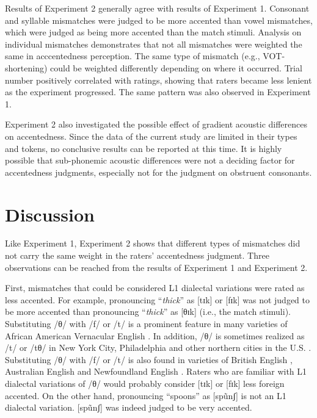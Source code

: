 Results of Experiment 2 generally agree with results of Experiment 1. Consonant and syllable mismatches were judged to be more accented than vowel mismatches, which were judged as being more accented than the match stimuli. Analysis on individual mismatches demonstrates that not all mismatches were weighted the same in acccentedness perception. The same type of mismatch (e.g., VOT-shortening) could be weighted differently depending on where it occurred. Trial number positively correlated with ratings, showing that raters became less lenient as the experiment progressed. The same pattern was also observed in Experiment 1. 

Experiment 2 also investigated the possible effect of gradient acoustic differences on accentedness. Since the data of the current study are limited in their types and tokens, no conclusive results can be reported at this time. It is highly possible that sub-phonemic acoustic differences were not a deciding factor for accentedness judgments, especially not for the judgment on obstruent consonants.

\section{Discussion}
Like Experiment 1, Experiment 2 shows that different types of mismatches did not carry the same weight in the raters’ accentedness judgment. Three observations can be reached from the results of Experiment 1 and Experiment 2.

First, mismatches that could be considered L1 dialectal variations were rated as less accented. For example, pronouncing “\textit{thick}” as [tɪk] or [fɪk] was not judged to be more accented than pronouncing “\textit{thick}” as [θɪk] (i.e., the match stimuli). Substituting /θ/ with /f/ or /t/ is a prominent feature in many varieties of African American Vernacular English \citep{Green_2002}. In addition, /θ/ is sometimes realized as /t/ or /tθ/ in New York City, Philadelphia and other northern cities in the U.S. \citep{Gordon_2008}. Substituting /θ/ with /f/ or /t/ is also found in varieties of British English \citep{Altendorf_2004}, Australian English \citep{Horvath_2008} and Newfoundland English \citep{Clarke_2008}.  Raters who are familiar with L1 dialectal variations of /θ/ would probably consider [tɪk] or [fɪk] less foreign accented. On the other hand, pronouncing “spoons” as [spũnʃ] is not an L1 dialectal variation. [spũnʃ] was indeed judged to be very accented. 

